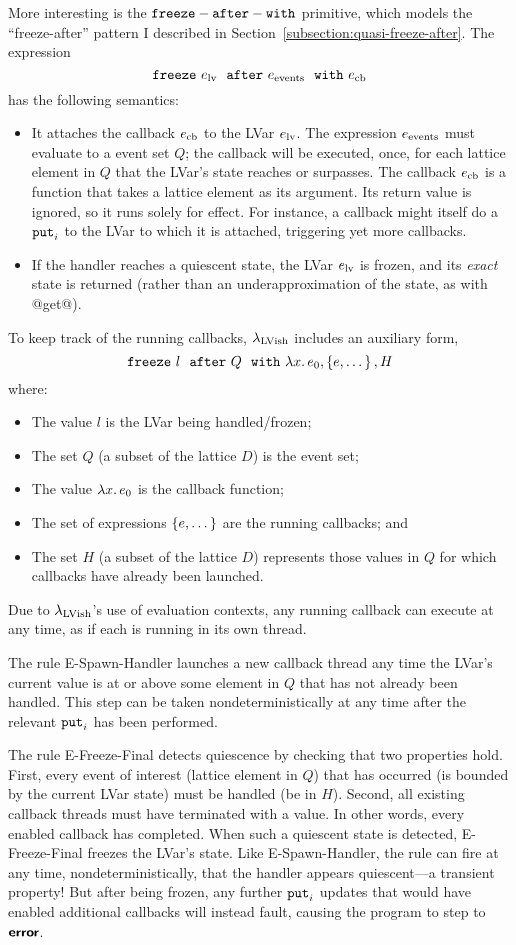 More interesting is the ${\mbox{\texttt{freeze}}-\mbox{\texttt{after}}-\mbox{\texttt{with}}}$ primitive, which models the
``freeze-after'' pattern I described in
Section~\ref{subsection:quasi-freeze-after}.  The expression
\[ \mbox{\texttt{freeze}}~e_{\rm lv}~~{\mbox{\texttt{after}}}~e_{\rm events}~~{\mbox{\texttt{with}}}~e_{\rm cb} \]
has the following semantics:
\begin{itemize}
\item It attaches the callback $e_{\rm cb}$ to the LVar $e_{\rm lv}$.
  The expression $e_{\rm events}$ must evaluate to a event set $Q$;
  the callback will be executed, once, for each lattice element in $Q$
  that the LVar's state reaches or surpasses.  The callback $e_{\rm
    cb}$ is a function that takes a lattice element as its argument.
  Its return value is ignored, so it runs solely for effect.  For
  instance, a callback might itself do a $\mbox{\texttt{put}}_i$ to the LVar to which
  it is attached, triggering yet more callbacks.
\item If the handler reaches a quiescent state, the LVar $e_{\rm lv}$
  is frozen, and its \emph{exact} state is returned (rather than an
  underapproximation of the state, as with @get@).
\end{itemize}
To keep track of the running callbacks, $\lambda_{\textrm{LVish}}$ includes an
auxiliary form,
\[
\mbox{\texttt{freeze}}~l~~{\mbox{\texttt{after}}}~Q~~{\mbox{\texttt{with}}}~\lambda x.\,e_0, \left\{e, \dots\right\}, H
\]
where:
\begin{itemize}
\item The value $l$ is the LVar being handled/frozen;
\item The set $Q$ (a subset of the lattice $D$) is the event set;
\item The value $\lambda x.\,e_0$ is the callback function;
\item The set of expressions $\left\{e, \dots\right\}$ are the running
  callbacks; and
\item The set $H$ (a subset of the lattice $D$) represents those
  values in $Q$ for which callbacks have already been launched.
\end{itemize}
Due to $\lambda_{\textrm{LVish}}$'s use of evaluation contexts, any running
callback can execute at any time, as if each is running in its own
thread.

The rule {\sc E-Spawn-Handler} launches a new callback thread any time
the LVar's current value is at or above some element in $Q$ that has
not already been handled.  This step can be taken nondeterministically
at any time after the relevant $\mbox{\texttt{put}}_i$ has been performed.

The rule {\sc E-Freeze-Final} detects quiescence by checking that two
properties hold.  First, every event of interest (lattice element in
$Q$) that has occurred (is bounded by the current LVar state) must be
handled (be in $H$).  Second, all existing callback threads must have
terminated with a value.  In other words, every enabled callback has
completed.  When such a quiescent state is detected, {\sc
  E-Freeze-Final} freezes the LVar's state.  Like {\sc
  E-Spawn-Handler}, the rule can fire at any time,
nondeterministically, that the handler appears quiescent---a transient
property!  But after being frozen, any further $\mbox{\texttt{put}}_i$ updates that
would have enabled additional callbacks will instead fault, causing
the program to step to $\textbf{\textsf{error}}$.

